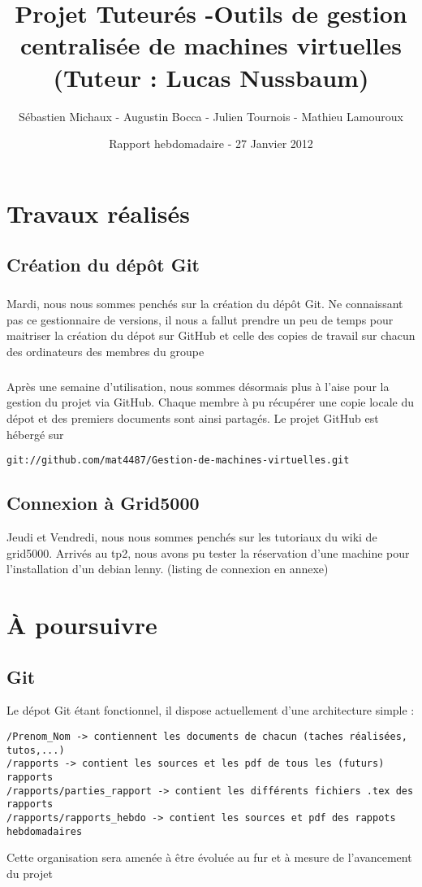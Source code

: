 \documentclass{article}
\begin{document}
\title{Projet Tuteurés -Outils de gestion centralisée de machines virtuelles (Tuteur : Lucas Nussbaum) }
\author{Sébastien Michaux - Augustin Bocca - Julien Tournois - Mathieu Lamouroux}
\date{Rapport hebdomadaire - 27 Janvier 2012}
\maketitle
\chapter{Travaux réalisés}
\section{Création du dépôt Git}
\paragraph{}
Mardi, nous nous sommes penchés sur la création du dépôt Git.
Ne connaissant pas ce gestionnaire de versions, il nous a fallut prendre un peu de temps pour maitriser la création du dépot sur GitHub et celle des copies de travail sur chacun des ordinateurs des membres du groupe
\paragraph{}
Après une semaine d'utilisation, nous sommes désormais plus à l'aise pour la gestion du projet via GitHub. Chaque membre à pu récupérer une copie locale du dépot et des premiers documents sont ainsi partagés.
Le projet GitHub est hébergé sur 
\begin{verbatim}
git://github.com/mat4487/Gestion-de-machines-virtuelles.git
\end{verbatim}

\section{Connexion à Grid5000}
Jeudi et Vendredi, nous nous sommes penchés sur les tutoriaux du wiki de grid5000.
Arrivés au tp2, nous avons pu tester la réservation d'une machine pour l'installation d'un debian lenny. (listing de connexion en annexe)

\chapter{À poursuivre}
\section{Git}
Le dépot Git étant fonctionnel, il dispose actuellement d'une architecture simple :
\begin{lstlisting}
/Prenom_Nom -> contiennent les documents de chacun (taches réalisées, tutos,...)
/rapports -> contient les sources et les pdf de tous les (futurs) rapports
/rapports/parties_rapport -> contient les différents fichiers .tex des rapports 
/rapports/rapports_hebdo -> contient les sources et pdf des rappots hebdomadaires
\end{lstlisting}
Cette organisation sera amenée à être évoluée au fur et à mesure de l'avancement du projet
\end{document}
